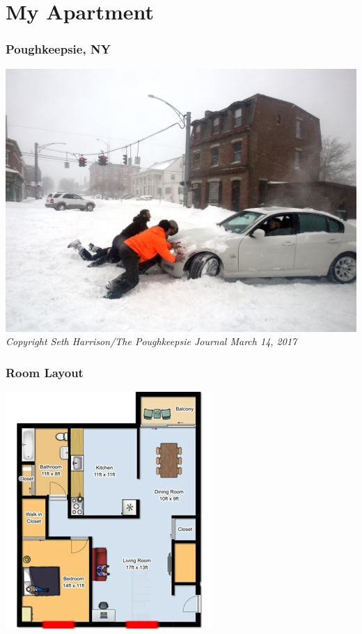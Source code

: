 \documentclass[aspectratio=169,11pt,hyperref={colorlinks=true}]{beamer}
\begin{document}
\section{My Apartment}
\begin{frame}
    \frametitle{Poughkeepsie, NY}
    \begin{center}
        \includegraphics[height=.85\textheight]{snow.jpg}\\
        \footnotesize
        \textit{Copyright Seth Harrison/The Poughkeepsie Journal March 14, 2017}
    \end{center}
\end{frame}

\begin{frame}
    \frametitle{Room Layout}
    \begin{center}
    \includegraphics[height=.85\textheight]{floorplan.png}
    \end{center}
\end{frame}
\end{document}
